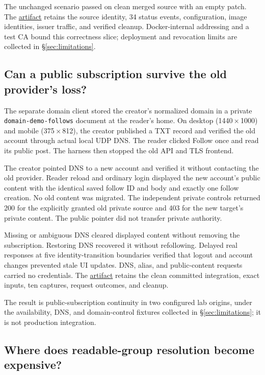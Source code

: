 \documentclass[sigconf, nonacm]{acmart}
\newcommand{\artifactbase}{https://github.com/jacoby149/web10}
\newcommand{\domainartifactrev}{26720acba859c7eb03fc5d26a6221cdde5b764a1}
\newcommand{\evidence}[2]{\href{\artifactbase/tree/\domainartifactrev/#1}{#2}}
\begin{document}
The unchanged scenario passed on clean merged source with an empty
patch. The \evidence{research/federation-demo}{artifact} retains the
source identity, 34 status events, configuration, image identities,
issuer traffic, and verified cleanup. Docker-internal addressing and a
test CA bound this correctness slice; deployment and revocation limits
are collected in \S\ref{sec:limitations}.

\subsection{Can a public subscription survive the old provider's loss?}
\label{sec:ev-domain}

The separate domain client stored the creator's normalized domain in a
private \texttt{domain-demo-follows} document at the reader's home.
On desktop (1440\,$\times$\,1000) and mobile (375\,$\times$\,812), the
creator published a TXT record and verified the old account through
actual local UDP DNS. The reader clicked Follow once and read its
public post. The harness then stopped the old API and TLS frontend.

The creator pointed DNS to a new account and verified it without
contacting the old provider. Reader reload and ordinary login displayed
the new account's public content with the identical saved follow ID and
body and exactly one follow creation. No old content was migrated.
The independent private controls returned 200 for the explicitly granted
old private source and 403 for the new target's private content. The
public pointer did not transfer private authority.

Missing or ambiguous DNS cleared displayed content without removing
the subscription. Restoring DNS recovered it without refollowing.
Delayed real responses at five identity-transition boundaries verified
that logout and account changes prevented stale UI updates. DNS, alias,
and public-content requests carried no credentials. The
\evidence{research/domain-portability-demo}{artifact} retains the clean
committed integration, exact inputs, ten captures, request outcomes,
and cleanup.

The result is public-subscription continuity in two configured lab
origins, under the availability, DNS, and domain-control fixtures
collected in \S\ref{sec:limitations}; it is not production integration.

\subsection{Where does readable-group resolution become expensive?}
\label{sec:ev-cost}
\end{document}
